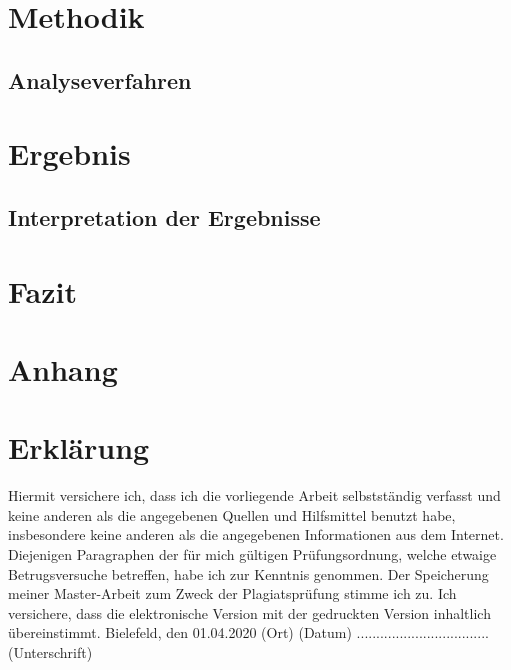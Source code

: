 \documentclass[
        ngerman,
        paper=a4,
        numbers=noendperiod,
]{scrreprt}
\begin{document}



\chapter{Methodik}
\section{Analyseverfahren}
\chapter{Ergebnis}
\section{Interpretation der Ergebnisse}
\chapter{Fazit}
\appendix 
\chapter{Anhang}
\label{chapter:Anhang}%


\clearpage
        
        
        




\chapter*{Erklärung}
Hiermit versichere ich, dass ich die vorliegende Arbeit selbstständig verfasst und keine anderen als die angegebenen Quellen und Hilfsmittel benutzt habe, insbesondere keine anderen als die angegebenen Informationen aus dem Internet. Diejenigen Paragraphen der für mich gültigen Prüfungsordnung, welche etwaige Betrugsversuche betreffen, habe ich zur Kenntnis genommen. Der Speicherung meiner Master-Arbeit zum Zweck der Plagiatsprüfung stimme ich zu. Ich versichere, dass die elektronische Version mit der gedruckten Version inhaltlich übereinstimmt.\newline
\linebreak
\linebreak
\linebreak
Bielefeld, den 01.04.2020\newline
(Ort) (Datum)\newline
\linebreak
\linebreak
\linebreak
..................................\newline
(Unterschrift)
\end{document}
